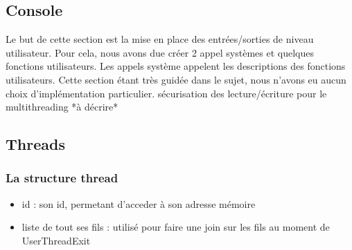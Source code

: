 \documentclass{article}
\begin{document}
	\subsection{Console}
	    {Le but de cette section est la mise en place des entrées/sorties de niveau utilisateur. Pour cela, nous avons due créer 2 appel systèmes et quelques fonctions utilisateurs. Les appels système appelent les descriptions des fonctions utilisateurs. Cette section étant très guidée dans le sujet, nous n'avons eu aucun choix d'implémentation particulier.
	    sécurisation des lecture/écriture pour le multithreading
		*à décrire*}
	\subsection{Threads}
		\subsubsection{La structure thread}
			\begin{itemize}
				\item id : son id, permetant d'acceder à son adresse mémoire
				\item liste de tout ses fils : utilisé pour faire une join sur les fils au moment de UserThreadExit
			\end{itemize}
\end{document}
